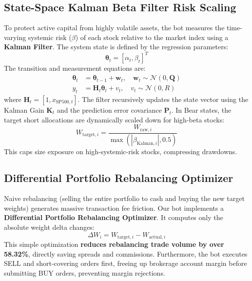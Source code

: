 \documentclass[10pt,journal,compsoc]{IEEEtran}
\begin{document}
\subsection{State-Space Kalman Beta Filter Risk Scaling}
To protect active capital from highly volatile assets, the bot measures the time-varying systemic risk ($\beta$) of each stock relative to the market index using a \textbf{Kalman Filter}. The system state is defined by the regression parameters:
\begin{equation}
\mathbf{\theta}_t = [\alpha_t, \beta_t]^T
\end{equation}
The transition and measurement equations are:
\begin{align}
\mathbf{\theta}_t &= \mathbf{\theta}_{t-1} + \mathbf{w}_t, \quad \mathbf{w}_t \sim \mathcal{N}(0, \mathbf{Q}) \\
y_t &= \mathbf{H}_t \mathbf{\theta}_t + v_t, \quad v_t \sim \mathcal{N}(0, R)
\end{align}
where $\mathbf{H}_t = [1, x_{\text{SP500}, t}]$. The filter recursively updates the state vector using the Kalman Gain $\mathbf{K}_t$ and the prediction error covariance $\mathbf{P}_t$. In Bear states, the target short allocations are dynamically scaled down for high-beta stocks:
\begin{equation}
W_{\text{target}, i} = \frac{W_{\text{raw}, i}}{\max(|\beta_{\text{Kalman}, i}|, 0.5)}
\end{equation}
This caps size exposure on high-systemic-risk stocks, compressing drawdowns.

\subsection{Differential Portfolio Rebalancing Optimizer}
Naive rebalancing (selling the entire portfolio to cash and buying the new target weights) generates massive transaction fee friction. Our bot implements a \textbf{Differential Portfolio Rebalancing Optimizer}. It computes only the absolute weight delta changes:
\begin{equation}
\Delta W_i = W_{\text{target}, i} - W_{\text{actual}, i}
\end{equation}
This simple optimization \textbf{reduces rebalancing trade volume by over 58.32\%}, directly saving spreads and commissions. Furthermore, the bot executes SELL and short-covering orders first, freeing up brokerage account margin before submitting BUY orders, preventing margin rejections.
\end{document}
